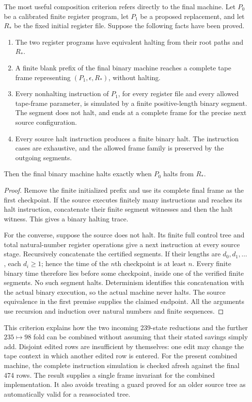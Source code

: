 The most useful composition criterion refers directly to the final
machine.  Let $P_0$ be a calibrated finite register program, let $P_1$ be
a proposed replacement, and let $R_*$ be the fixed initial register file.
Suppose the following facts have been proved.
\begin{enumerate}
\item The two register programs have equivalent halting from their root
      paths and $R_*$.
\item A finite blank prefix of the final binary machine reaches a complete
      tape frame representing $(P_1,\epsilon,R_*)$, without halting.
\item Every nonhalting instruction of $P_1$, for every register file and
      every allowed tape-frame parameter, is simulated by a finite
      positive-length binary segment.  The segment does not halt, and
      ends at a complete frame for the precise next source configuration.
\item Every source halt instruction produces a finite binary halt.
      The instruction cases are exhaustive, and the allowed frame family
      is preserved by the outgoing segments.
\end{enumerate}
Then the final binary machine halts exactly when $P_0$ halts from $R_*$.

\begin{proof}
Remove the finite initialized prefix and use its complete final frame as
the first checkpoint.  If the source executes finitely many instructions
and reaches its halt instruction, concatenate their finite segment
witnesses and then the halt witness.  This gives a binary halting trace.

For the converse, suppose the source does not halt.  Its finite full
control tree and total natural-number register operations give a next
instruction at every source stage.  Recursively concatenate the certified
segments.  If their lengths are $d_0,d_1,\ldots$, each $d_i\geq1$; hence
the time of the $n$th checkpoint is at least $n$.  Every finite binary time
therefore lies before some checkpoint, inside one of the verified finite
segments.  No such segment halts.  Determinism identifies this concatenation
with the actual binary execution, so the actual machine never halts.
The source equivalence in the first premise supplies the claimed endpoint.
All the arguments use recursion and induction over natural numbers and
finite sequences.
\end{proof}

This criterion explains how the two incoming 239-state reductions and the
further $235\mapsto98$ fold can be combined without assuming that their
stated savings simply add.  Disjoint
edited rows are insufficient by themselves: one edit may change the tape
context in which another edited row is entered.  For the present combined
machine, the complete instruction simulation is checked afresh against
the final 474 rows.  The result supplies a single frame invariant for the
combined implementation.  It also avoids treating a guard proved for an
older source tree as automatically valid for a reassociated tree.

